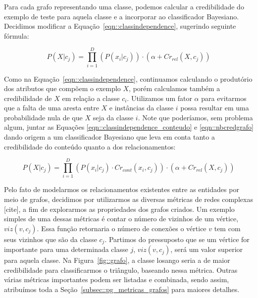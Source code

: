 Para cada grafo representando uma classe, podemos calcular a credibilidade do exemplo de teste para aquela classe e a incorporar ao classificador Bayesiano. Decidimos modificar a Equação~\ref{eqn::classindependence}, sugerindo seguinte fórmula:

\begin{equation}\label{eqn::nbcredgrafo}
P(X|c_{j}) = \prod^{D}_{i=1}{(P(x_i|c_j)) \cdot (\alpha + Cr_{rel}(X,c_j)) } 
\end{equation}

Como na Equação~\ref{eqn::classindependence}, continuamos calculando o produtório dos atributos que compõem o exemplo $X$, porém calculamos também a credibilidade de $X$ em relação a classe $c_i$. Utilizamos um fator $\alpha$ para evitarmos que a falta de uma aresta entre $X$ e instâncias da classe $i$ possa resultar em uma probabilidade nula de que $X$ seja da classe $i$. Note que poderíamos, sem problema algum, juntar as Equações \ref{eqn::classindependence_conteudo} e \ref{eqn::nbcredgrafo} dando origem a um classificador Bayesiano que leva em conta tanto a credibilidade do conteúdo quanto a dos relacionamentos:

\begin{equation}\label{eqn::nbcredcompleta}
P(X|c_{j}) = \prod^{D}_{i=1}{(P(x_i|c_j) \cdot Cr_{cont}(x_i,c_j)) \cdot (\alpha + Cr_{rel}(X,c_j)) } 
\end{equation}


Pelo fato de modelarmos os relacionamentos existentes entre as entidades por meio de grafos, decidimos por utilizarmos as diversas métricas de redes complexas [cite], a fim de explorarmos as propriedades dos grafos criados. Um exemplo simples de uma dessas métricas é contar o número de vizinhos de um vértice, $viz(v,c_j)$. Essa função retornaria o número de conexões o vértice $v$ tem com seus vizinhos que são da classe $c_j$. Partimos do pressuposto que se um vértice for importante para uma determinada classe $j$, $viz(v,c_j)$, será um valor superior para aquela classe. Na Figura~\ref{fig::grafo}, a classe losango seria a de maior credibilidade para classificarmos o triângulo, baseando nessa métrica. Outras várias métricas importantes podem ser listadas e combinada, sendo assim, atribuímos toda a Seção~\ref{subsec::pg_metricas_grafos} para maiores detalhes.  



